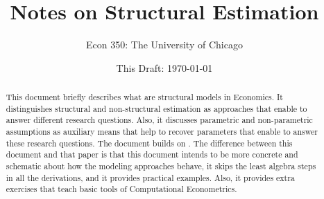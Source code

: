 




\title{\textbf{Notes on Structural Estimation}}
\author{Econ 350: The University of Chicago}
\date{This Draft: \today}
\maketitle

\begin{abstract}
\noindent This document briefly describes what are structural models in Economics. It distinguishes structural and non-structural estimation as approaches that enable to answer different research questions. Also, it discusses parametric and non-parametric assumptions as auxiliary means that help to recover parameters that enable to answer these research questions. The document builds on \citet{keane2011structural}. The difference between this document and that paper is that this document intends to be more concrete and schematic about how the modeling approaches behave, it skips the least algebra steps in all the derivations, and it provides practical examples. Also, it provides extra exercises that teach basic tools of Computational Econometrics.
\end{abstract}





\clearpage


\clearpage






